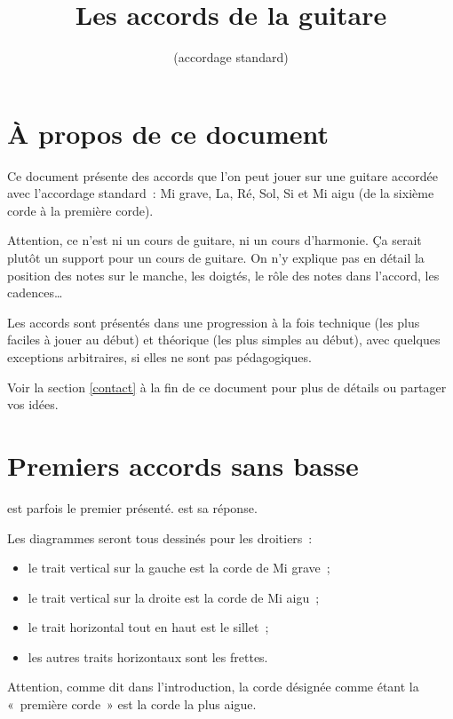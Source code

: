 \documentclass[11pt]{article}
\title{\vspace{-5em}Les accords de la guitare}
\author{(accordage standard)}
\date{}
\begin{document}
\maketitle

\setcounter{tocdepth}{2}
\tableofcontents

\section{À propos de ce document}

Ce document présente des accords que l’on peut jouer sur une guitare accordée
avec l’accordage standard~: Mi grave, La, Ré, Sol, Si et Mi aigu (de la
sixième corde à la première corde).

Attention, ce n’est ni un cours de guitare, ni un cours d’harmonie.
Ça serait plutôt un support pour un cours de guitare. On n’y explique pas en
détail la position des notes sur le manche, les doigtés, le rôle des notes dans
l’accord, les cadences…

Les accords sont présentés dans une progression à la fois technique (les plus
faciles à jouer au début) et théorique (les plus simples au début), avec
quelques exceptions arbitraires, si elles ne sont pas pédagogiques.

Voir la section \ref{contact} à la fin de ce document pour plus de détails ou
partager vos idées.

\section{Premiers accords sans basse}

 est parfois le premier présenté.
\hspace{2em}
 est sa réponse.

Les diagrammes seront tous dessinés pour les droitiers~:

\begin{itemize}
\item le trait vertical sur la gauche est la corde de Mi grave~;
\item le trait vertical sur la droite est la corde de Mi aigu~;
\item le trait horizontal tout en haut est le sillet~;
\item les autres traits horizontaux sont les frettes.
\end{itemize}

Attention, comme dit dans l’introduction, la corde désignée comme étant la
«~première corde~» est la corde la plus aigue.
\end{document}
